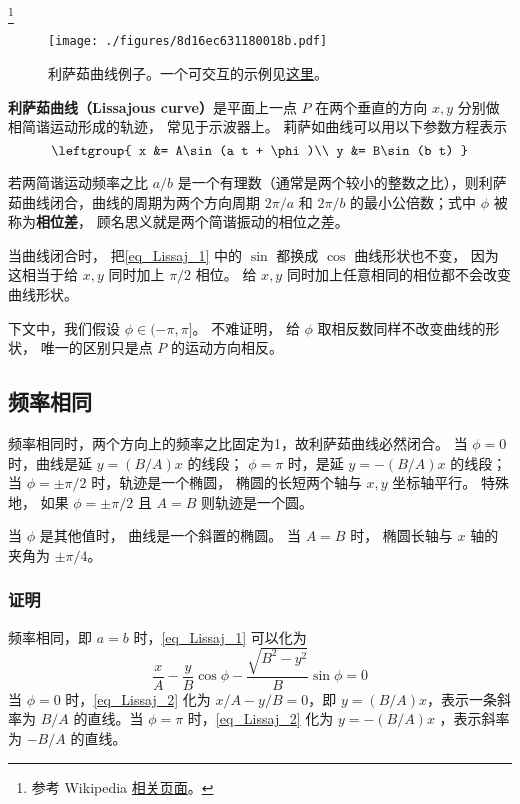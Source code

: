 

\footnote{参考 Wikipedia \href{https://en.wikipedia.org/wiki/Lissajous_curve}{相关页面}。}

\begin{figure}[ht]
\centering
\texttt{[image: ./figures/8d16ec631180018b.pdf]}
\caption{利萨茹曲线例子。一个可交互的示例见\href{https://www.geogebra.org/m/ubcdrmjb}{这里}。} \label{fig_Lissaj_3}
\end{figure}

\textbf{利萨茹曲线（Lissajous curve）}是平面上一点 $P$ 在两个垂直的方向 $x, y$ 分别做相简谐运动形成的轨迹， 常见于示波器上。 莉萨如曲线可以用以下参数方程表示
\begin{equation}\label{eq_Lissaj_1}
\leftgroup{
x &= A\sin(a t + \phi)\\
y &= B\sin(b t)
}\end{equation}

若两简谐运动频率之比 $a/b$ 是一个有理数（通常是两个较小的整数之比），则利萨茹曲线闭合，曲线的周期为两个方向周期 $2\pi/a$ 和 $2\pi/b$ 的最小公倍数；式中 $\phi$ 被称为\textbf{相位差}， 顾名思义就是两个简谐振动的相位之差。

当曲线闭合时， 把\autoref{eq_Lissaj_1} 中的 $\sin$ 都换成 $\cos$ 曲线形状也不变， 因为这相当于给 $x, y$ 同时加上 $\pi/2$ 相位。 给 $x, y$ 同时加上任意相同的相位都不会改变曲线形状。

下文中，我们假设 $\phi \in (-\pi, \pi]$。 不难证明， 给 $\phi$ 取相反数同样不改变曲线的形状， 唯一的区别只是点 $P$ 的运动方向相反。

\subsection{频率相同}
频率相同时，两个方向上的频率之比固定为1，故利萨茹曲线必然闭合。
当 $\phi = 0$ 时，曲线是延 $y=(B/A)x$ 的线段； $\phi = \pi$ 时，是延 $y=-(B/A)x$ 的线段； 当 $\phi = \pm\pi/2$ 时，轨迹是一个椭圆， 椭圆的长短两个轴与 $x,y$ 坐标轴平行。 特殊地， 如果 $\phi = \pm\pi/2$ 且 $A = B$ 则轨迹是一个圆。

当 $\phi$ 是其他值时， 曲线是一个斜置的椭圆。 当 $A = B$ 时， 椭圆长轴与 $x$ 轴的夹角为 $\pm\pi/4$。
\subsubsection{证明}
频率相同，即 $a=b$ 时，\autoref{eq_Lissaj_1} 可以化为
\begin{equation}\label{eq_Lissaj_2}
\frac xA-\frac yB\cos\phi-\frac{\sqrt{B^2-y^2}}{B}\sin\phi=0
\end{equation}
当 $\phi=0$ 时，\autoref{eq_Lissaj_2} 化为 $x/A-y/B=0$，即 $y=(B/A)x$，表示一条斜率为 $B/A$ 的直线。当 $\phi=\pi$ 时，\autoref{eq_Lissaj_2} 化为 $y=-(B/A)x$ ，表示斜率为 $-B/A$ 的直线。

